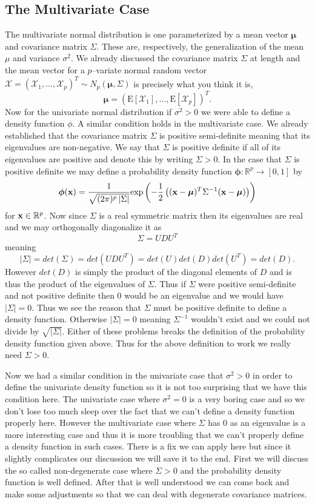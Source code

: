 \documentclass{book}
\newcommand{\bs}[1]{\boldsymbol{#1}}
\newcommand{\rv}[1]{\bs{\mathscr{#1}}}
\newcommand{\e}[1]{\text{E}\left[#1\right]}
\begin{document}
\subsection{The Multivariate Case}

The multivariate normal distribution is one parameterized by a mean vector $\bs{\mu}$ and covariance matrix $\Sigma$. These are, respectively, the generalization of the mean $\mu$ and variance $\sigma^2$. We already discussed the covariance matrix $\Sigma$ at length and the mean vector for a $p$--variate normal random vector $\rv{X}=(\mathscr{X}_1,\ldots,\mathscr{X}_p)^T\sim N_p(\bs{\mu}, \Sigma)$ is precisely what you think it is,
$$
\bs{\mu}=(\e{\mathscr{X}_1},\ldots,\e{\mathscr{X}_p})^T.
$$
Now for the univariate normal distribution if $\sigma^2>0$ we were able to define a density function $\phi$. A similar condition holds in the multivariate case. We already established that the covariance matrix $\Sigma$ is positive semi-definite meaning that its eigenvalues are non-negative. We say that $\Sigma$ is positive definite if all of its eigenvalues are positive and denote this by writing $\Sigma >0$. In the case that $\Sigma$ is positive definite we may define a probability density function $\bs{\phi}:\mathbb{R}^p\rightarrow \left[0,1\right]$ by 
$$
\bs{\phi}({\bf x})=\frac{1}{\sqrt{(2\pi)^{p}\left|\Sigma\right|}}\text{exp}\left(-\frac{1}{2}\left(({\bf x}-\bs{\mu})^T\Sigma^{-1}({\bf x}-\bs{\mu})\right)\right)
$$
for ${\bf x}\in\mathbb{R}^p$. Now since $\Sigma$ is a real symmetric matrix then its eigenvalues are real and we may orthogonally diagonalize it as 
$$
\Sigma=UDU^T
$$
meaning
$$
\left|\Sigma\right|=det(\Sigma)=det(UDU^T)=det(U)det(D)det(U^T)=det(D).
$$
However $det(D)$ is simply the product of the diagonal elements of $D$ and is thus the product of the eigenvalues of $\Sigma$. Thus if $\Sigma$ were positive semi-definite and not positive definite then 0 would be an eigenvalue and we would have $\left|\Sigma\right|=0$. Thus we see the reason that $\Sigma$ must be positive definite to define a density function. Otherwise $\left|\Sigma\right|=0$ meaning $\Sigma^{-1}$ wouldn't exist and we could not divide by $\sqrt{|\Sigma|}$. Either of these problems breaks the definition of the probability density function given above. Thus for the above definition to work we really need $\Sigma>0$. 

Now we had a similar condition in the univariate case that $\sigma^2>0$ in order to define the univariate density function so it is not too surprising that we have this condition here. The univariate case where $\sigma^2=0$ is a very boring case and so we don't lose too much sleep over the fact that we can't define a density function properly here. However the multivariate case where $\Sigma$ has $0$ as an eigenvalue is a more interesting case and thus it is more troubling that we can't properly define a density function in such cases. There is a fix we can apply here but since it slightly complicates our discussion we will save it to the end. First we will discuss the so called non-degenerate case where $\Sigma>0$ and the probability density function is well defined. After that is well understood we can come back and make some adjustments so that we can deal with degenerate covariance matrices. 
\end{document}
